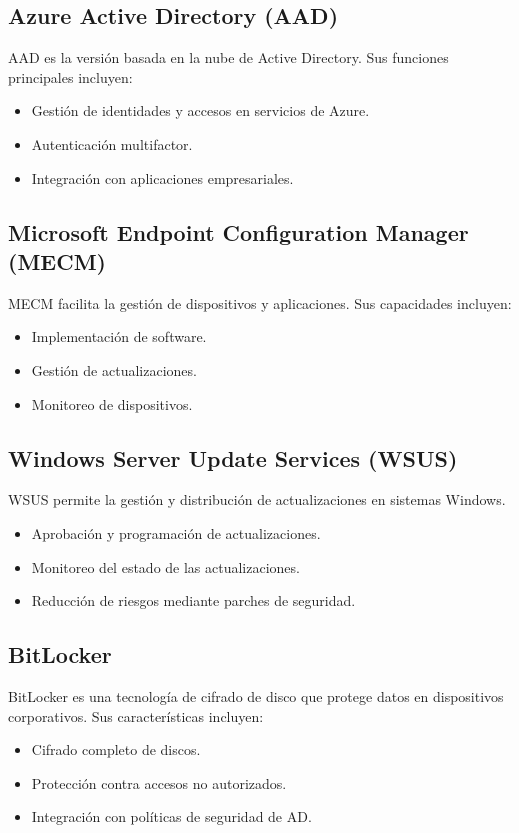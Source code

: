 \subsection{Azure Active Directory (AAD)}

AAD es la versión basada en la nube de Active Directory. Sus funciones
principales incluyen:
\begin{itemize}
    \item Gestión de identidades y accesos en servicios de Azure.
    \item Autenticación multifactor.
    \item Integración con aplicaciones empresariales.
\end{itemize}

\subsection{Microsoft Endpoint Configuration Manager (MECM)}

MECM facilita la gestión de dispositivos y aplicaciones. Sus capacidades
incluyen:
\begin{itemize}
    \item Implementación de software.
    \item Gestión de actualizaciones.
    \item Monitoreo de dispositivos.
\end{itemize}

\subsection{Windows Server Update Services (WSUS)}

WSUS permite la gestión y distribución de actualizaciones en sistemas Windows.
\begin{itemize}
    \item Aprobación y programación de actualizaciones.
    \item Monitoreo del estado de las actualizaciones.
    \item Reducción de riesgos mediante parches de seguridad.
\end{itemize}

\subsection{BitLocker}

BitLocker es una tecnología de cifrado de disco que protege datos en dispositivos
corporativos. Sus características incluyen:
\begin{itemize}
    \item Cifrado completo de discos.
    \item Protección contra accesos no autorizados.
    \item Integración con políticas de seguridad de AD.
\end{itemize}

